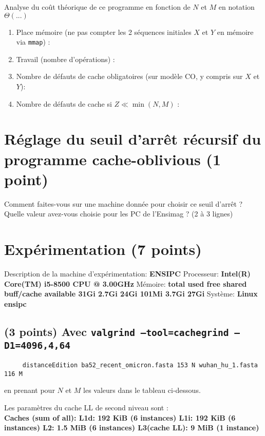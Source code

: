 \documentclass[10pt,a4paper]{article}
\begin{document}
{Analyse du coût théorique de ce programme en fonction de $N$ et $M$ en notation $\Theta(...)$
\begin{enumerate}
  \item Place mémoire (ne pas compter les 2 séquences initiales $X$ et $Y$ en mémoire via {\tt mmap}) :
  \item Travail (nombre d'opérations) :
  \item Nombre de défauts de cache obligatoires (sur modèle CO, y compris sur $X$ et $Y$):
  \item Nombre de défauts de cache si $Z \ll \min(N,M)$ :
\end{enumerate}

\section{Réglage du seuil d'arrêt récursif du programme cache-oblivious (1 point)}
Comment faites-vous sur une machine donnée pour choisir ce seuil d'arrêt ? Quelle valeur avez-vous choisie pour les PC de l'Ensimag ? (2 à 3 lignes)

\section{Expérimentation (7 points)}

Description de la machine d'expérimentation: \textbf{ENSIPC}
Processeur: \textbf{Intel(R) Core(TM) i5-8500 CPU @ 3.00GHz}
Mémoire: \textbf{total        used        free      shared  buff/cache   available
          31Gi       2.7Gi        24Gi       101Mi       3.7Gi        27Gi}
Système: \textbf{Linux ensipc}

\subsection{(3 points) Avec {\tt valgrind --tool=cachegrind --D1=4096,4,64}}
\begin{verbatim}
     distanceEdition ba52_recent_omicron.fasta 153 N wuhan_hu_1.fasta 116 M
\end{verbatim}
en prenant pour $N$ et $M$ les valeurs dans le tableau ci-dessous.

Les paramètres du cache LL de second niveau sont :\\ \textbf{Caches (sum of all):     
L1d:                   192 KiB (6 instances)
L1i:                   192 KiB (6 instances)
L2:                    1.5 MiB (6 instances)
L3(cache LL):          9 MiB (1 instance)
}

}
\end{document}
